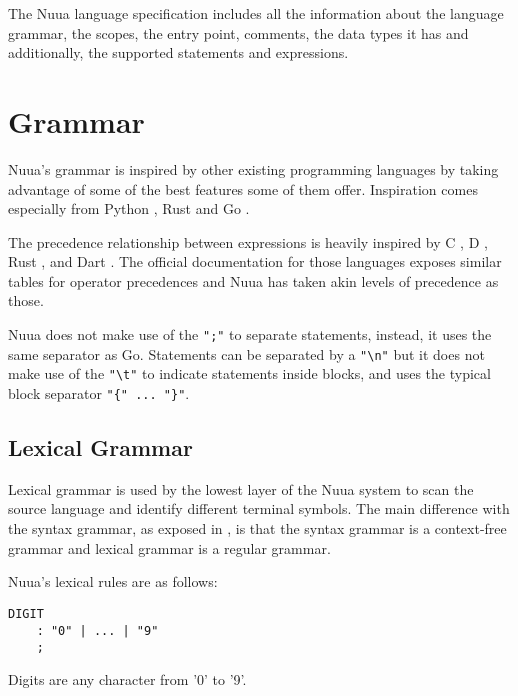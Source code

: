 The Nuua language specification includes all the information about the language grammar, the scopes, the entry point, comments,
the data types it has and additionally, the supported statements and expressions.

\section{Grammar}
\label{sec:nuua_grammar}

Nuua's grammar is inspired by other existing programming languages by taking advantage of some of the best features some of them offer.
Inspiration comes especially from Python \autocite{python_programming_language}, Rust \autocite{rust_programming_language} and
Go \autocite{go_programming_language}.

The precedence relationship between expressions is heavily inspired by C \autocite{c_programming_language}, D \autocite{d_programming_language},
Rust \autocite{rust_programming_language}, and Dart \autocite{dart_programming_language}. The official documentation for those languages
exposes similar tables for operator precedences and Nuua has taken akin levels of precedence as those.

Nuua does not make use of the \texttt{";"} to separate statements, instead, it uses the same separator as Go. Statements can be separated by
a \texttt{"\textbackslash n"} but it does not make use of the \texttt{"\textbackslash t"} to indicate statements inside blocks, and uses the typical
block separator \texttt{"\{" ... "\}"}.

\subsection{Lexical Grammar}

Lexical grammar is used by the lowest layer of the Nuua system to scan the source language and identify different terminal symbols.
The main difference with the syntax grammar, as exposed in \autocite[Appendix~I]{crafting_interpreters}, is that the syntax grammar is a context-free grammar and lexical grammar is a regular grammar.

Nuua's lexical rules are as follows:

\clearpage

\begin{lstlisting}
DIGIT
    : "0" | ... | "9"
    ;
\end{lstlisting}

Digits are any character from '0' to '9'.

